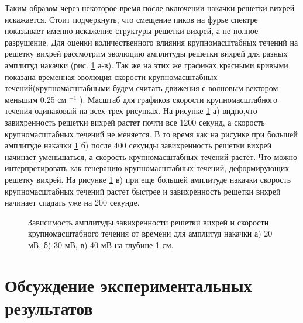 Таким образом через некоторое время после включении накачки решетки вихрей искажается. Стоит подчеркнуть, что смещение пиков на фурье спектре показывает именно искажение структуры решетки вихрей, а не полное разрушение. Для оценки количественного влияния крупномасштабных течений на решетку вихрей рассмотрим эволюцию амплитуды решетки вихрей для разных амплитуд накачки (рис. \ref{img:underLong} а-в). Так же на этих же графиках красными кривыми показана временная эволюция скорости крупномасштабных течений(крупномасштабными будем считать движения с волновым вектором меньшим 0.25 см $^{-1}$ ). Масштаб для графиков скорости крупномасштабного течения одинаковый на всех трех рисунках. На рисунке \ref{img:underLong} а) видно,что завихренность решетки вихрей растет почти все 1200 секунд, а скорость крупномасштабных течений не меняется. В то время как на рисунке при большей амплитуде накачки \ref{img:underLong} б) после 400 секунды завихренность решетки вихрей начинает уменьшаться, а скорость крупномасштабных течений растет. Что можно интерпретировать как генерацию крупномасштабных течений, деформирующих решетку вихрей. На рисунке \ref{img:underLong} в) при еще большей амплитуде накачки скорость крупномасштабных течений растет быстрее и завихренность решетки вихрей начинает спадать уже на 200 секунде.

\begin{figure}[ht]
  \begin{minipage}[ht]{0.326\linewidth}
  \end{minipage}
  \begin{minipage}[ht]{0.326\linewidth}
  \end{minipage}
  \begin{minipage}[ht]{0.326\linewidth}
  \end{minipage}
    \caption{Зависимость амплитуды завихренности решетки вихрей и скорости крупномасштабного течения от времени для амплитуд накачки а) 20 мВ, б) 30 мВ, в) 40 мВ на глубине 1 см.}
  \label{img:underLong}  
\end{figure}

\section{Обсуждение экспериментальных результатов} \label{sect6_4}

